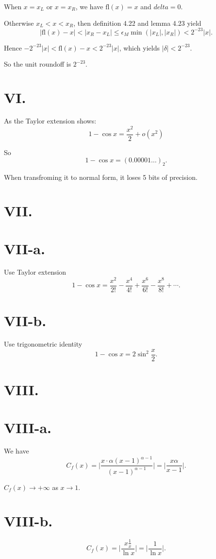 \documentclass[a4paper]{article}
\begin{document}
When $x=x_L$ or $x=x_R$, we have $\mathrm{fl}(x)=x$ and $delta=0$.

Otherwise $x_L<x<x_R$, then definition 4.22 and lemma 4.23 yield
$$
  |\mathrm{fl}(x)-x|<|x_R-x_L|\leq\epsilon_M \min(|x_L|,|x_R|)<2^{-23}|x|.
$$

Hence $-2^{-23}|x|<\mathrm{fl}(x)-x<2^{-23}|x|$, which yields $|\delta|<2^{-23}$. 

So the unit roundoff is $2^{-23}$.

\section*{VI.}
As the Taylor extension shows: 
$$
1-\cos x=\frac{x^2}{2}+o(x^2)
$$

So 
$$
1-\cos x=(0.00001\ldots)_2.
$$

When transfroming it to normal form, it loses 5 bits of precision.

\section*{VII.}
\section*{VII-a.}
Use Taylor extension 
$$
1-\cos x=\frac{x^2}{2!}-\frac{x^4}{4!}+\frac{x^6}{6!}-\frac{x^8}{8!}+\cdots.
$$

\section*{VII-b.}
Use trigonometric identity 
$$
1-\cos x=2\sin^2\frac{x}{2}.
$$

\section*{VIII.}
\section*{VIII-a.}
We have
$$
C_f(x)=\lvert \dfrac{x\cdot\alpha(x-1)^{\alpha-1}}{(x-1)^{\alpha-1}}\rvert=\lvert \dfrac{x\alpha}{x-1}\rvert.
$$

$C_f(x)\rightarrow+\infty$ as $x\rightarrow 1$.

\section*{VIII-b.}
$$
C_f(x)=\lvert \dfrac{x\frac{1}{x}}{\ln x}\rvert=\lvert \dfrac{1}{\ln x}\rvert.
$$
\end{document}
